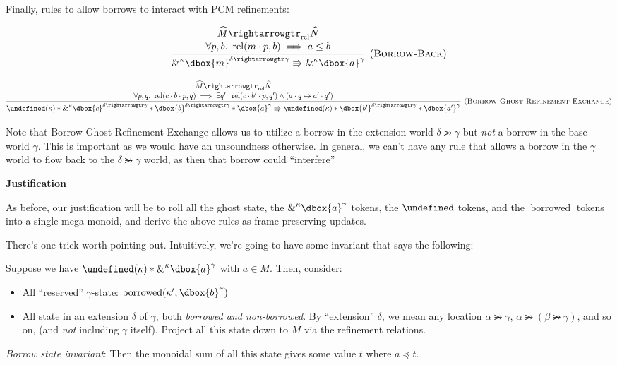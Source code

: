 \documentclass{article}
\newcommand{\einfer}[3]
        {\infer[(\textsc{#1})]{#3}{#2}}
\newcommand{\stacktwo}[2]{\stackanchor{\ensuremath{#1}}{\ensuremath{#2}}}
\newcommand\dboxed[1]{\dbox{\vphantom{t}\ensuremath{#1}}}
\newcommand{\viewshift}{\Rrightarrow}
\DeclareMathOperator{\rel}{rel}
\newcommand{\borrow}[2]{\textsc{\&}^{#1}#2}
\newcommand{\refines}{\rightarrowgtr}
\DeclareMathOperator{\borrowed}{borrowed}
\let\active\undefined
\DeclareMathOperator{\active}{active}
\begin{document}
Finally, rules to allow borrows to interact with PCM refinements:

\[
  \einfer{Borrow-Back}{
    \stacktwo{
      \widehat{M} \refines_{\rel} \widehat{N}
    }{
      \forall p, b .~ \rel(m \cdot p, b) \implies a \le b
    }
  }{
    \borrow{\kappa}{\dboxed{m}^{\delta \refines \gamma}} \viewshift \borrow{\kappa}{\dboxed{a}^\gamma}
  }
\]

\[
  \einfer{Borrow-Ghost-Refinement-Exchange}{
    \stacktwo{
      \widehat{M} \refines_{\rel} \widehat{N}
    }{
      \forall p,q.~ \rel(c\cdot b\cdot p, q) \implies \exists q' .~ \rel(c \cdot b' \cdot p, q') \land (a \cdot q \mapsto a' \cdot q')
    }
  }{
    \active(\kappa) *
    \borrow{\kappa}{\dboxed{c}^{\delta\refines\gamma}} *
    \dboxed{b}^{\delta\refines\gamma} * \dboxed{a}^\gamma
      \viewshift
    \active(\kappa) *
    \dboxed{b'}^{\delta\refines\gamma} * \dboxed{a'}^\gamma
  }
\]


Note that Borrow-Ghost-Refinement-Exchange allows us to utilize a borrow in the extension world $\delta \refines \gamma$ but \emph{not} a borrow in the base world $\gamma$. This is important as we would have an unsoundness otherwise. In general, we can't have any rule that allows a borrow in the $\gamma$ world to flow back to the $\delta \refines \gamma$ world, as then that borrow could ``interfere''

\textbf{Justification}

As before, our justification will be to roll all the ghost state, the $\borrow{\kappa}{\dboxed{a}^\gamma}$ tokens, the $\active$ tokens, and the $\borrowed$
tokens into a single mega-monoid, and derive the above rules as frame-preserving updates.

There's one trick worth pointing out. Intuitively, we're going to have some invariant
that says the following:

Suppose we have $\active(\kappa) * \borrow{\kappa}{\dboxed{a}^\gamma}$ with $a \in M$. Then, consider:
\begin{itemize}
  \item All ``reserved'' $\gamma$-state: $\borrowed(\kappa', \dboxed{b}^\gamma)$
  \item All state in an extension $\delta$ of $\gamma$, both \emph{borrowed and non-borrowed}.
        By ``extension'' $\delta$, we mean any location $\alpha \refines \gamma$,
        $\alpha \refines (\beta \refines \gamma)$, and so on, (and \emph{not} including $\gamma$ itself).
        Project all this state down to $M$ via the refinement relations.
\end{itemize}
\emph{Borrow state invariant}: Then the monoidal sum of all this state gives some value $t$ where $a \preceq t$.
\end{document}
